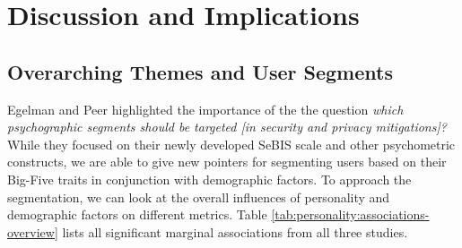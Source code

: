 






\section{Discussion and Implications}


\subsection{Overarching Themes and User Segments}
Egelman and Peer highlighted the importance of the the question \textit{which psychographic segments should be targeted [in security and privacy mitigations]?} While they focused on their newly developed SeBIS scale and other psychometric constructs, we are able to give new pointers for segmenting users based on their Big-Five traits in conjunction with demographic factors. To approach the segmentation, we can look at the overall influences of personality and demographic factors on different metrics. Table \ref{tab:personality:associations-overview} lists all significant marginal associations from all three studies. 

